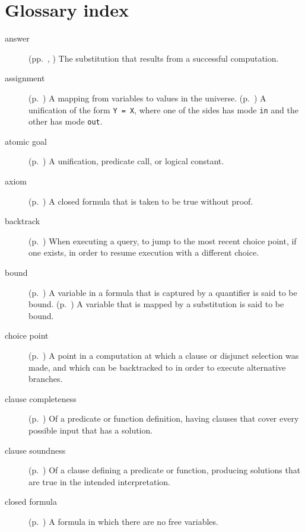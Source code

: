 \chapter{Glossary index}
\label{sec:glossary}

\begin{description}

\item[answer]
(pp.~\pageref{gi:answer}, \pageref{gi:answer2})
The substitution that results from a successful computation.

\item[assignment]
(p.~\pageref{sec:assignments})
A mapping from variables to values in the universe.
(p.~\pageref{gi:assignment})
A unification of the form \texttt{Y = X},
where one of the sides has mode \texttt{in}
and the other has mode \texttt{out}.

\item[atomic goal]
(p.~\pageref{gi:atomic})
A unification, predicate call, or logical constant.

\item[axiom]
(p.~\pageref{gi:axiom})
A closed formula that is taken to be true without proof.

\item[backtrack]
(p.~\pageref{gi:backtrack})
When executing a query,
to jump to the most recent choice point,
if one exists,
in order to resume execution
with a different choice.

\item[bound]
(p.~\pageref{gi:bound})
A variable in a formula that is captured by a quantifier
is said to be bound.
(p.~\pageref{gi:bound2})
A variable that is mapped by a substitution is said to be bound.

\item[choice point]
(p.~\pageref{gi:choice-point})
A point in a computation at which a clause or disjunct selection was made,
and which can be backtracked to in order to execute alternative branches.

\item[clause completeness]
(p.~\pageref{gi:clause-completeness})
Of a predicate or function definition,
having clauses that cover every possible input that has a solution.

\item[clause soundness]
(p.~\pageref{gi:clause-soundness})
Of a clause defining a predicate or function,
producing solutions that are true in the intended interpretation.

\item[closed formula]
(p.~\pageref{gi:closed-formula})
A formula in which there are no free variables.


\end{description}
